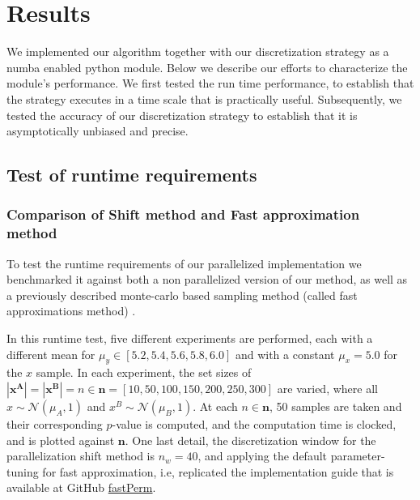 \documentclass[a4paper]{article}
\begin{document}
\section{Results}
\label{sec:result}


We implemented our algorithm together with our discretization strategy as a numba\cite{lam2015numba} enabled python module. Below we describe our efforts to characterize the module's performance. We first tested the run time performance, to establish that the strategy executes in a time scale that is practically useful. Subsequently, we tested the accuracy of our discretization strategy to establish that it is asymptotically unbiased and precise.   

\subsection{Test of runtime requirements}
\subsubsection{Comparison of Shift method and Fast approximation method}
\label{sec:runtime1}
To test the runtime requirements of our parallelized implementation we benchmarked it against both a non parallelized version of our method, as well as a previously described monte-carlo based sampling method (called fast approximations method) \cite{segal2018fast}.

In this runtime test, five different experiments are performed, each with a different mean for $\mu_y \in [5.2, 5.4, 5.6, 5.8, 6.0]$ and with a constant $\mu _x = 5.0$ for the $x$ sample. In each experiment, the set sizes of $|\mathbf{x^{A}}|=|\mathbf{x^{B}}|=n \in \mathbf{n}=[10, 50, 100, 150, 200, 250, 300]$ are varied, where all $x \sim \mathcal{N}(\mu _A,1)$ and $x^{B} \sim \mathcal{N}(\mu _B,1)$. At each $n \in \mathbf{n}$, 50 samples are taken and their corresponding $p$-value is computed, and the computation time is clocked, and is plotted against $\mathbf{n}$. One last detail, the  discretization window for the parallelization shift method is $n_w=40$, and applying the default parameter-tuning for fast approximation, i.e, replicated the implementation guide that is available at GitHub \href{https://github.com/bdsegal/fastPerm}{fastPerm}.
\end{document}
